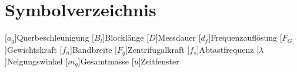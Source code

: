 \chapter*{Symbolverzeichnis}
\begin{acronym}[BreiteDerLinkenSpalte]
[$a_q$]{Querbeschleunigung}
[$B_l$]{Blocklänge}
[$D$]{Messdauer}
[$d_f$]{Frequenzauflösung}
[$F_G$]{Gewichtskraft}
[$f_n$]{Bandbreite}
[$F_q$]{Zentrifugalkraft}
[$f_s$]{Abtastfrequenz}
[$\lambda$]{Neigungswinkel}
[$m_g$]{Gesamtmasse}
[$u$]{Zeitfenster}
\end{acronym}
